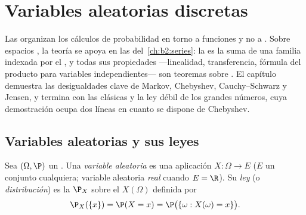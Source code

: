 \chapter{Variables aleatorias discretas}\label{ch:b2:randomvar}

Las  organizan los cálculos de probabilidad en
torno a funciones y no a . Sobre espacios , la
teoría se apoya en las  del~\cref{ch:b2:series}: la
 es la suma de una familia indexada por el
, y todas sus propiedades ---linealidad, transferencia,
fórmula del producto para variables independientes--- son teoremas sobre
. El capítulo demuestra las desigualdades clave de
Markov, Chebyshev, Cauchy--Schwarz y Jensen, y termina con las
 clásicas y la ley débil de los grandes números, cuya demostración
ocupa dos líneas en cuanto se dispone de Chebyshev.

\section{Variables aleatorias y sus leyes}

\begin{definition}\label{def:b2:randomvar:law}
Sea $(\Omega, \P)$ un  . Una
\emph{variable aleatoria} es una aplicación
$X \colon \Omega \to E$ ($E$ un conjunto cualquiera; variable
aleatoria \emph{real} cuando $E = \R$). Su \emph{ley} (o \emph{distribución})
es la  $\P_X$ sobre el 
$X(\Omega)$ definida por
\[
\P_X(\{x\}) = \P(X = x)
= \P\bigl(\{\omega : X(\omega) = x\}\bigr) .
\]
\end{definition}

